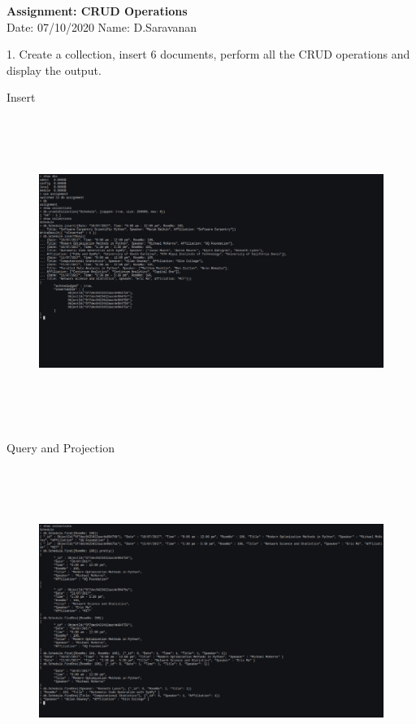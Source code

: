 \documentclass[a4paper,11pt,openright]{report}
\begin{document}
\singlespacing
\pagestyle{plain}

\begin{small}
\begin{center}
\textbf{Assignment: CRUD Operations} \\
Date: 07/10/2020 \hspace{2mm} Name: D.Saravanan
\end{center}
\end{small}

\vspace{10px}

\begin{footnotesize}
1. Create a collection, insert 6 documents, perform all the CRUD operations and display the
output.
\end{footnotesize}

{\footnotesize Insert}
\begin{figure}[ht!]
\includegraphics[width=20cm,height=10cm,keepaspectratio]{image1.pdf}
\centering
\end{figure}

{\footnotesize Query and Projection}
\begin{figure}[ht!]
\includegraphics[width=20cm,height=10cm,keepaspectratio]{image2.pdf}
\centering
\end{figure}
\end{document}
